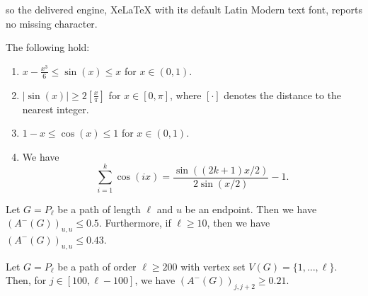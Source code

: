 \documentclass[10pt,a4paper]{amsart}
\begin{document}
so the delivered engine, XeLaTeX with its default Latin Modern text font, reports no missing character.
\begin{lemma}\label{lemma:sin_cos}
   The following hold:
    \begin{enumerate}[$(i)$]
        \item $x-\frac{x^3}6 \le \sin(x) \le x$ for $x\in (0,1)$.
        \item $|\sin(x)|\ge 2[\frac{x}{\pi}]$ for $x\in [0,\pi]$, where $[\cdot]$ denotes the distance to the nearest integer.
        \item $1-x\le \cos(x)\le 1$ for $x\in (0,1)$.
        \item We have 
        \[\sum_{i = 1}^k \cos(i x) = \frac{\sin((2k + 1) x / 2)}{2\sin(x / 2)} - 1.\]
    \end{enumerate}
\end{lemma}

\begin{lemma}\label{lem:path-endpoint}
Let $G = P_\ell$ be a path of length $\ell$ and $u$ be an endpoint. Then we have $(A^-(G))_{u, u} \leq 0.5.$ Furthermore, if $\ell \geq 10$, then we have $(A^-(G))_{u, u} \leq 0.43.$
\end{lemma}

\begin{lemma}\label{lem:path-off-diagonal}
Let $G = P_\ell$ be a path of order $\ell \geq 200$ with vertex set $V(G)=\{1,\ldots, \ell\}$. Then, for $j \in [100, \ell - 100]$, we have $(A^-(G))_{j, j + 2} \geq 0.21.$
\end{lemma}
\end{document}
